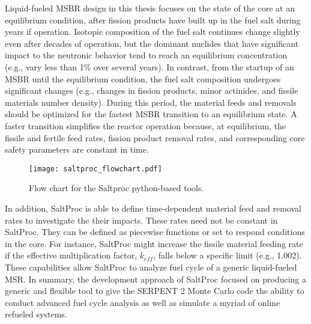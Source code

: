 Liquid-fueled \gls{MSBR} design in this thesis focuses on the state of the core at an equilibrium condition, after fission products have built up in the fuel salt during years if operation. Isotopic composition of the fuel salt continues change slightly even after decades of operation, but the dominant nuclides that have significant impact to the neutronic behavior tend to reach an equilibrium concentration (e.g., vary less than 1\% over several years). In contrast, from the startup of an \gls{MSBR} until the equilibrium condition, the fuel salt composition undergoes significant changes (e.g., changes in fission products, minor actinides, and fissile materials number density). During this period, the material feeds and removals should be optimized for the fastest \gls{MSBR} transition to an equilibrium state. A faster transition simplifies the reactor operation because, at equilibrium, the fissile and fertile feed rates, fission product removal rates, and corresponding core safety parameters are constant in time.

\begin{figure}[htp!] %
  \centering
  \vspace{-0.3em}
  \texttt{[image: saltproc\_flowchart.pdf]}
  \caption{Flow chart for the Saltproc python-based tools.}
  \vspace{-1.0em}
  \label{fig:saltproc_flow}
\end{figure}
\FloatBarrier

In addition, SaltProc is able to define time-dependent material feed and removal rates to investigate the their impacts. These rates need not be constant in SaltProc. They can be defined as piecewise functions or set to respond conditions in the core. For instance, SaltProc might increase the fissile material feeding rate if the effective multiplication factor, $k_{eff}$, falls below a specific limit (e.g., 1.002). 
These capabilities allow SaltProc to analyze fuel cycle of a generic liquid-fueled \gls{MSR}. In summary, the development approach of SaltProc focused on producing a generic and flexible tool to give the SERPENT 2 Monte Carlo code the ability to conduct advanced fuel cycle analysis as well as simulate a myriad of online refueled systems.
